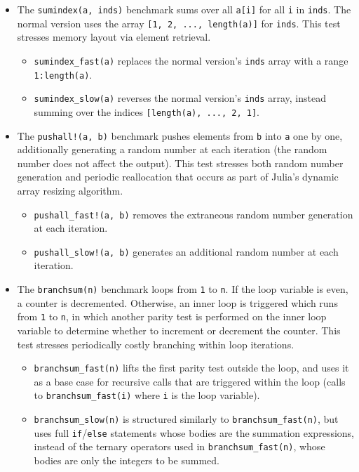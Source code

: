 \documentclass[conference]{IEEEtran}
\begin{document}
\begin{itemize}
    \item The \lstinline|sumindex(a, inds)| benchmark sums over all \lstinline|a[i]| for all \lstinline|i| in \lstinline|inds|. The normal version uses the array \lstinline|[1, 2, ..., length(a)]| for \lstinline|inds|. This test stresses memory layout via element retrieval.
    \begin{itemize}
        \item \lstinline|sumindex_fast(a)| replaces the normal version's \lstinline|inds| array with a range \lstinline|1:length(a)|.
        \item \lstinline|sumindex_slow(a)| reverses the normal version's \lstinline|inds| array, instead summing over the indices \lstinline|[length(a), ..., 2, 1]|.
    \end{itemize}
    \item The \lstinline|pushall!(a, b)| benchmark pushes elements from \lstinline|b| into \lstinline|a| one by one, additionally generating a random number at each iteration (the random number does not affect the output). This test stresses both random number generation and periodic reallocation that occurs as part of Julia's dynamic array resizing algorithm.
    \begin{itemize}
        \item \lstinline|pushall_fast!(a, b)| removes the extraneous random number generation at each iteration.
        \item \lstinline|pushall_slow!(a, b)| generates an additional random number at each iteration.
    \end{itemize}
    \item The \lstinline|branchsum(n)| benchmark loops from \lstinline|1| to \lstinline|n|. If the loop variable is even, a counter is decremented. Otherwise, an inner loop is triggered which runs from \lstinline|1| to \lstinline|n|, in which another parity test is performed on the inner loop variable to determine whether to increment or decrement the counter. This test stresses periodically costly branching within loop iterations.
    \begin{itemize}
        \item \lstinline|branchsum_fast(n)| lifts the first parity test outside the loop, and uses it as a base case for recursive calls that are triggered within the loop (calls to \lstinline|branchsum_fast(i)| where \lstinline|i| is the loop variable).
        \item \lstinline|branchsum_slow(n)| is structured similarly to \lstinline|branchsum_fast(n)|, but uses full \lstinline|if|/\lstinline|else| statements whose bodies are the summation expressions, instead of the ternary operators used in \lstinline|branchsum_fast(n)|, whose bodies are only the integers to be summed.

\end{itemize}
\end{itemize}
\end{document}
